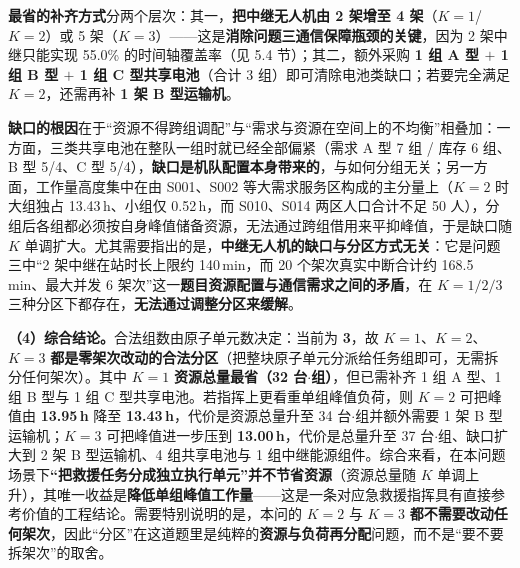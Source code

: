 \textbf{最省的补齐方式}分两个层次：其一，\textbf{把中继无人机由 2 架增至 4 架}（$K=1$/$K=2$）或 5 架（$K=3$）——这是\textbf{消除问题三通信保障瓶颈的关键}，因为 2 架中继只能实现 55.0\% 的时间轴覆盖率（见 5.4 节）；其二，额外采购 \textbf{1 组 A 型 $+$ 1 组 B 型 $+$ 1 组 C 型共享电池}（合计 3 组）即可清除电池类缺口；若要完全满足 $K=2$，还需再补 \textbf{1 架 B 型运输机}。

\textbf{缺口的根因}在于“资源不得跨组调配”与“需求与资源在空间上的不均衡”相叠加：一方面，三类共享电池在整队一组时就已经全部偏紧（需求 A 型 7 组 / 库存 6 组、B 型 5/4、C 型 5/4），\textbf{缺口是机队配置本身带来的}，与如何分组无关；另一方面，工作量高度集中在由 S001、S002 等大需求服务区构成的主分量上（$K=2$ 时大组独占 13.43\,h、小组仅 0.52\,h，而 S010、S014 两区人口合计不足 50 人），分组后各组都必须按自身峰值储备资源，无法通过跨组借用来平抑峰值，于是缺口随 $K$ 单调扩大。尤其需要指出的是，\textbf{中继无人机的缺口与分区方式无关}：它是问题三中“2 架中继在站时长上限约 140\,min，而 20 个架次真实中断合计约 168.5\,min、最大并发 6 架次”这一\textbf{题目资源配置与通信需求之间的矛盾}，在 $K=1/2/3$ 三种分区下都存在，\textbf{无法通过调整分区来缓解}。

\textbf{（4）综合结论。}合法组数由原子单元数决定：当前为 \textbf{3}，故 $K=1$、$K=2$、$K=3$ \textbf{都是零架次改动的合法分区}（把整块原子单元分派给任务组即可，无需拆分任何架次）。其中 $K=1$ \textbf{资源总量最省（32 台$\cdot$组）}，但已需补齐 1 组 A 型、1 组 B 型与 1 组 C 型共享电池。若指挥上更看重单组峰值负荷，则 $K=2$ 可把峰值由 \textbf{13.95\,h} 降至 \textbf{13.43\,h}，代价是资源总量升至 34 台$\cdot$组并额外需要 1 架 B 型运输机；$K=3$ 可把峰值进一步压到 \textbf{13.00\,h}，代价是总量升至 37 台$\cdot$组、缺口扩大到 2 架 B 型运输机、4 组共享电池与 1 组中继能源组件。综合来看，在本问题场景下\textbf{“把救援任务分成独立执行单元”并不节省资源}（资源总量随 $K$ 单调上升），其唯一收益是\textbf{降低单组峰值工作量}——这是一条对应急救援指挥具有直接参考价值的工程结论。需要特别说明的是，本问的 $K=2$ 与 $K=3$ \textbf{都不需要改动任何架次}，因此“分区”在这道题里是纯粹的\textbf{资源与负荷再分配}问题，而不是“要不要拆架次”的取舍。

